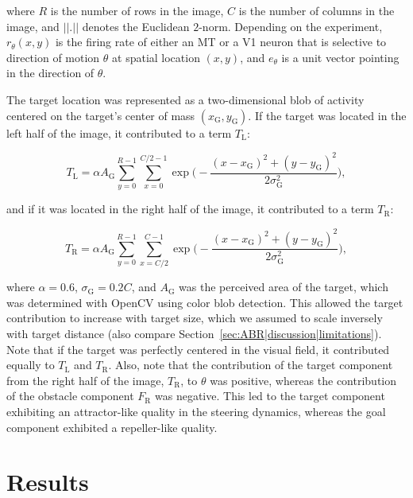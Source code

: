 where $R$ is the number of rows in the image, $C$ is the number
of columns in the image, and $||.||$ denotes the Euclidean $2$-norm.
Depending on the experiment, $r_\theta(x,y)$ is the firing rate of either
an \ac{MT} or a \ac{V1} neuron that is selective to direction of motion 
$\theta$ at spatial location $(x,y)$, and 
$e_\theta$ is a unit vector pointing in the direction of $\theta$.

The target location was represented as a two-dimensional blob
of activity centered on the target's center of mass 
$(x_\textrm{G}, y_\textrm{G})$. If the
target was located in the left half of the image, it contributed to a
term $T_\textrm{L}$:

\begin{equation}
T_\textrm{L} = \alpha A_\textrm{G} \sum_{y=0}^{R-1} \sum_{x=0}^{C/2-1} 
	\exp \bigg( 
    -\frac{
    	(x-x_\textrm{G})^2 + (y-y_\textrm{G})^2
    }{
    	2\sigma^2_\textrm{G}
    } \bigg),
\label{eqn:ABR|model|PPC|TL}
\end{equation}

and if it was located in the right half of the image, it contributed
to a term $T_\textrm{R}$:

\begin{equation}
T_\textrm{R} = \alpha A_\textrm{G} \sum_{y=0}^{R-1} \sum_{x=C/2}^{C-1} 
	\exp \bigg( 
    -\frac{
    	(x-x_\textrm{G})^2 + (y-y_\textrm{G})^2
    }{
    	2\sigma^2_\textrm{G}
    } \bigg),
\label{eqn:ABR|model|PPC|TR}
\end{equation}

where $\alpha=0.6$, $\sigma_\textrm{G}=0.2C$, and $A_\textrm{G}$
was the perceived area of the target, 
which was determined with OpenCV using color
blob detection. This allowed the target contribution to increase
with target size, which we assumed to scale inversely with target
distance (also compare 
Section~\ref{sec:ABR|discussion|limitations}).
Note that if
the target was perfectly centered in the visual field, it contributed
equally to $T_\textrm{L}$ and $T_\textrm{R}$. 
Also, note that the contribution of the
target component from the right half of the image, $T_\textrm{R}$, 
to $\theta$ was positive, 
whereas the contribution of the obstacle component $F_\textrm{R}$
was negative. This led to the target component exhibiting an
attractor-like quality in the steering dynamics, whereas the goal
component exhibited a repeller-like quality.


\section{Results}

